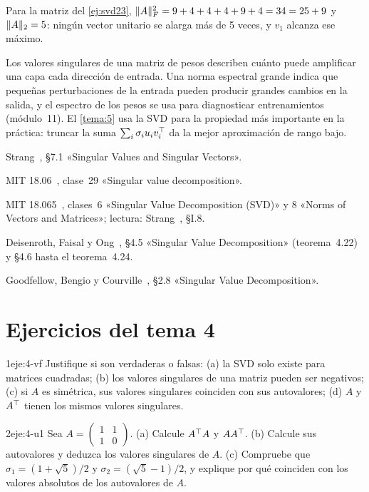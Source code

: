 \begin{ejemplo}
Para la matriz del \cref{ej:svd23}, $\lVert A\rVert_F^{2}=9+4+4+4+9+4=34=25+9$ y $\lVert A\rVert_2=5$: ningún vector unitario se alarga más de 5 veces, y $v_1$ alcanza ese máximo.
\end{ejemplo}

\begin{observacion}
Los valores singulares de una matriz de pesos describen cuánto puede amplificar una capa cada dirección de entrada. Una norma espectral grande indica que pequeñas perturbaciones de la entrada pueden producir grandes cambios en la salida, y el espectro de los pesos se usa para diagnosticar entrenamientos (módulo~11). El \cref{tema:5} usa la SVD para la propiedad más importante en la práctica: truncar la suma $\sum_i\sigma_iu_iv_i^{\top}$ da la mejor aproximación de rango bajo.
\end{observacion}

\begin{lecturas}
\item Strang~\cite{strang-ila}, §7.1 «Singular Values and Singular Vectors».
\item MIT 18.06~\cite{mit1806}, clase~29 «Singular value decomposition».
\item MIT 18.065~\cite{mit18065}, clases~6 «Singular Value Decomposition (SVD)» y 8 «Norms of Vectors and Matrices»; lectura: Strang~\cite{strang-lafd}, §I.8.
\item Deisenroth, Faisal y Ong~\cite{mml}, §4.5 «Singular Value Decomposition» (teorema~4.22) y §4.6 hasta el teorema~4.24.
\item Goodfellow, Bengio y Courville~\cite{gbc}, §2.8 «Singular Value Decomposition».
\end{lecturas}

\section*{Ejercicios del tema 4}

\begin{ejercicio}{1}{eje:4-vf}
Justifique si son verdaderas o falsas: (a) la SVD solo existe para matrices cuadradas; (b) los valores singulares de una matriz pueden ser negativos; (c) si $A$ es simétrica, sus valores singulares coinciden con sus autovalores; (d) $A$ y $A^{\top}$ tienen los mismos valores singulares.
\end{ejercicio}

\begin{ejercicio}{2}{eje:4-u1}
Sea $A=\begin{pmatrix}1&1\\1&0\end{pmatrix}$. (a) Calcule $A^{\top} A$ y $AA^{\top}$. (b) Calcule sus autovalores y deduzca los valores singulares de $A$. (c) Compruebe que $\sigma_1=(1+\sqrt{5})/2$ y $\sigma_2=(\sqrt{5}-1)/2$, y explique por qué coinciden con los valores absolutos de los autovalores de $A$.
\end{ejercicio}

